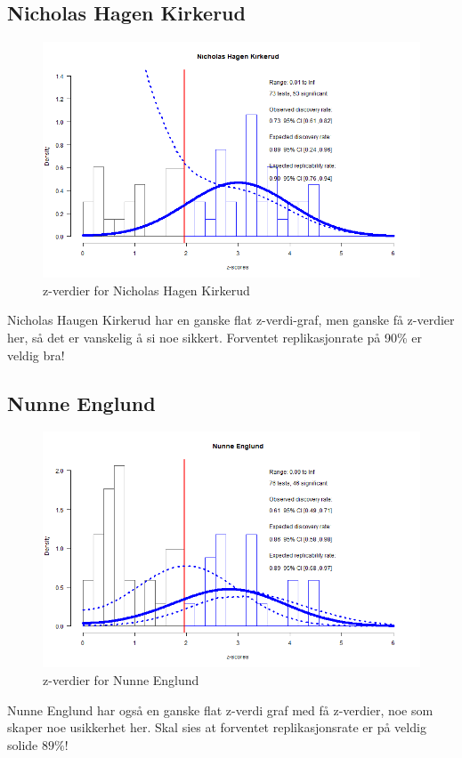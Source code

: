 \documentclass[doc,norsk]{apa7}
\begin{document}
\subsection{Nicholas Hagen Kirkerud}
\begin{figure}[h!]
    \centering
    \includegraphics[width=\textwidth]{images/Nicholas Hagen Kirkerud.png}
    \caption{z-verdier for Nicholas Hagen Kirkerud}
\end{figure}
Nicholas Haugen Kirkerud har en ganske flat z-verdi-graf, men ganske få z-verdier her, så det er vanskelig å si noe sikkert. Forventet replikasjonrate på 90\% er veldig bra!

\subsection{Nunne Englund}
\begin{figure}[h!]
    \centering
    \includegraphics[width=\textwidth]{images/Nunne Englund.png}
    \caption{z-verdier for Nunne Englund}
\end{figure}
Nunne Englund har også en ganske flat z-verdi graf med få z-verdier, noe som skaper noe usikkerhet her. Skal sies at forventet replikasjonsrate er på veldig solide $89\%$!
\end{document}
